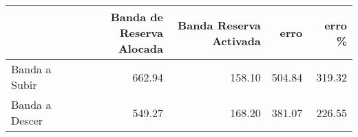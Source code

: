 \begin{tabular}{lrrrr}
\toprule
 & Banda de Reserva Alocada & Banda Reserva Activada & erro & erro \% \\
\midrule
Banda a Subir & 662.94 & 158.10 & 504.84 & 319.32 \\
Banda a Descer & 549.27 & 168.20 & 381.07 & 226.55 \\
\bottomrule
\end{tabular}

